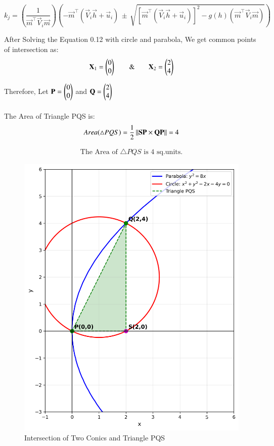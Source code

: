 \documentclass[journal]{IEEEtran}
\begin{document}
\begin{equation}
    k_{j} = \left( \dfrac{1}{\vec{m}^\top\vec{V}_i\vec{m}} \right) \left( 
    -\vec{m}^\top(\vec{V}_i\vec{h}+\vec{u}_i) \, \pm \, \sqrt{[\vec{m}^\top(\vec{V}_i\vec{h}+\vec{u}_i)]^2 - g(h)(\vec{m}^\top\vec{V}_i\vec{m})} \right) 
\end{equation}

After Solving the Equation 0.12 with circle and parabola, We get common points of intersection as:
\begin{equation}
    \mathbf{X}_1 = \begin{pmatrix}0 \\ 0\end{pmatrix} \qquad \& \qquad \mathbf{X}_2 = \begin{pmatrix}2 \\ 4\end{pmatrix}
\end{equation}

Therefore,
Let $\mathbf{P} = \begin{pmatrix}0 \\ 0\end{pmatrix}$ and $\mathbf{Q} = \begin{pmatrix}2 \\ 4\end{pmatrix}$\\\\

The Area of Triangle PQS is:
\begin{equation}
    Area(\triangle PQS) = \dfrac{1}{2}\left\lVert\mathbf{SP} \times \mathbf{QP}\right\rVert = 4
\end{equation}

\begin{align*}
    \boxed{\text{The Area of $\triangle PQS$ is 4 sq.units.}}
\end{align*}


\begin{figure}[htbp]
    \centering
    \includegraphics[width=0.9\columnwidth]{figs/fig1.png}
    \caption{Intersection of Two Conics and Triangle PQS}
    \label{fig:figs/fig1.png}
\end{figure}
\end{document}
